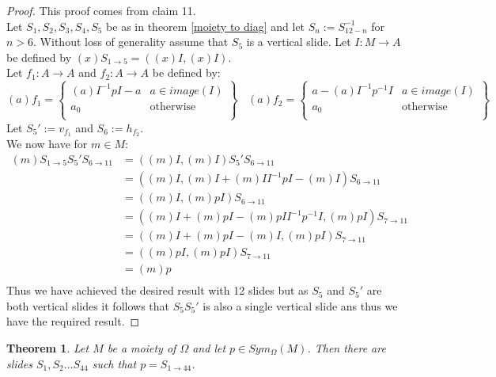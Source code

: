 \documentclass{report}
\newtheorem{theorem}{Theorem}[section]
\begin{document}
\begin{proof}
This proof comes from \cite{shuffle1} claim 11.\\
Let \(S_1,S_2,S_3,S_4,S_5\) be as in theorem \ref{moiety to diag} and let \(S_n:=S_{12-n}^{-1}\) for \(n>6\). Without loss of generality assume that \(S_5\) is a vertical slide.
Let \(I:M \rightarrow A\) be defined by \((x)S_{1\rightarrow 5}=((x)I,(x)I)\).\\
 Let \(f_1:A\rightarrow A\) and \(f_2:A\rightarrow A\) be defined by:
\[(a)f_1=\left\{\begin{array}{lr}
(a)I^{-1}pI-a& a\in image(I)\\
a_0 & \text{otherwise}\\
\end{array}\right\} \ \ \ \ (a)f_2=\left\{\begin{array}{lr}
a-(a)I^{-1}p^{-1}I& a\in image(I)\\
a_0 & \text{otherwise}\\
\end{array}\right\}\]
Let \(S_5':=v_{f_1}\) and \(S_6:=h_{f_2}\).\\
We now have for \(m \in M\):
\begin{align*}
(m)S_{1\rightarrow 5}S_5'S_{6\rightarrow 11}&=((m)I,(m)I)S_5'S_{6\rightarrow 11}\\
&=((m)I,(m)I+(m)II^{-1}pI-(m)I)S_{6\rightarrow 11}\\
&=((m)I,(m)pI)S_{6\rightarrow 11}\\
&=((m)I+(m)pI-(m)pII^{-1}p^{-1}I,(m)pI)S_{7\rightarrow 11}\\
&=((m)I+(m)pI-(m)I,(m)pI)S_{7\rightarrow 11}\\
&=((m)pI,(m)pI)S_{7\rightarrow 11}\\
&=(m)p\\
\end{align*}
Thus we have achieved the desired result with 12 slides but as \(S_5\) and \(S_5'\) are both vertical slides it follows that \(S_5S_5'\) is also a single vertical slide ans thus we have the required result.
\end{proof}
\begin{theorem}\label{moiety realised}
Let \(M\) be a moiety of \(\Omega\) and let \(p\in Sym_{\Omega}(M)\). Then there are slides \(S_1,S_2\ldots S_{44}\) such that \(p=S_{1\rightarrow 44}\).
\end{theorem}
\end{document}
